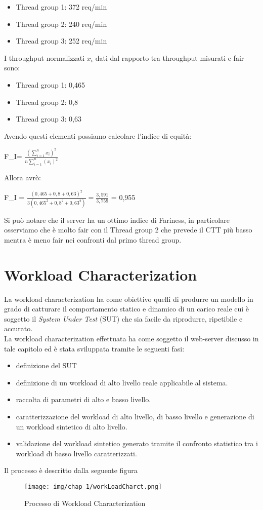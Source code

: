 \begin{itemize}
    \item Thread group 1: 372 req/min
    \item Thread group 2: 240 req/min
    \item Thread group 3: 252 req/min
\end{itemize}

I throughput normalizzati $x_{i}$ dati dal rapporto tra throughput misurati e fair sono: 
\begin{itemize}
    \item Thread group 1: 0,465
    \item Thread group 2: 0,8
    \item Thread group 3: 0,63
\end{itemize}
Avendo questi elementi possiamo calcolare l'indice di equità: 
\begin{center}
F\_I= $\frac{(\sum^n_{i=1}{x_i})^2}{n\sum^n_{i=1} (x_i)^2}$     
\end{center}
Allora avrò: 
\begin{center}
   F\_I =  $\frac{(0,465+0,8+0,63)^2}{3(0,465^2+0,8^2+0,63^2)} = \frac{3,591}{3,759}$ = 0,955
\end{center}
Si può notare che il server ha un ottimo indice di Fariness, in particolare osserviamo che è molto fair con il Thread group 2 che prevede il CTT più basso mentra è meno fair nei confronti dal primo thread group.
\section{Workload Characterization}
La workload characterization ha come obiettivo quelli di produrre un modello in grado di catturare il comportamento statico e dinamico di un carico reale cui è soggetto il \textit{System Under Test} (SUT) che sia facile da riprodurre, ripetibile e accurato.\\
La workload characterization effettuata ha come soggetto il web-server discusso in tale capitolo ed è stata sviluppata tramite le seguenti fasi:
\begin{itemize}
    \item definizione del SUT 
    \item definizione di un workload di alto livello reale applicabile al sistema.
    \item raccolta di parametri di alto e basso livello.
    \item caratterizzazione del workload di alto livello, di basso livello e generazione di un workload sintetico di alto livello.
    \item validazione del workload sintetico generato tramite il confronto statistico tra i workload di basso livello caratterizzati.
\end{itemize}
Il processo è descritto dalla seguente figura
\begin{figure}[H]
    \centering
    \texttt{[image: img/chap\_1/workLoadCharct.png]}
    \caption{Processo di Workload Characterization}
    \label{fig:workLC}
\end{figure}
